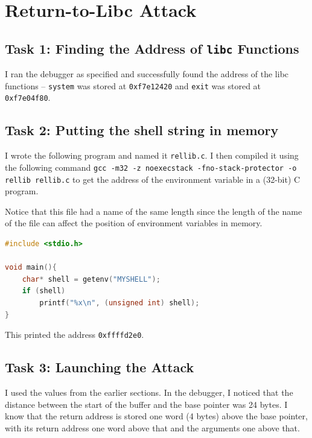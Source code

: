\documentclass[10pt,\jkfside,a4paper]{article}
\begin{document}
\section{Return-to-Libc Attack}

\subsection{Task 1: Finding the Address of \texttt{libc} Functions}

I ran the debugger as specified and successfully found the address of the
libc functions -- \texttt{system} was stored at \texttt{0xf7e12420} and
\texttt{exit} was stored at \texttt{0xf7e04f80}.

\subsection{Task 2: Putting the shell string in memory}

I wrote the following program and named it \texttt{rellib.c}. I then
compiled it using the following command
\texttt{gcc -m32 -z noexecstack -fno-stack-protector -o rellib rellib.c} to
get the address of the environment variable in a (32-bit) C program.

Notice that this file had a name of the same length since the length of the
name of the file can affect the position of environment variables in memory.

\begin{lstlisting}[language=C]
#include <stdio.h>

void main(){
	char* shell = getenv("MYSHELL");
	if (shell)
		printf("%x\n", (unsigned int) shell);
}
\end{lstlisting}

This printed the address \texttt{0xffffd2e0}.

\subsection{Task 3: Launching the Attack}

I used the values from the earlier sections. In the debugger, I noticed that
the distance between the start of the buffer and the base pointer was 24
bytes. I know that the return address is stored one word (4 bytes) above the
base pointer, with its return address one word above that and the arguments
one above that.
\end{document}
